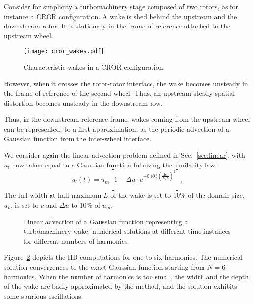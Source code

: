 
Consider for simplicity a turbomachinery stage composed of two rotors,
as for instance a CROR configuration.
A wake is shed behind
the upstream and the downstream rotor. 
It is stationary in the frame of reference attached to the upstream wheel.
\begin{figure}[htp]
    \centering\texttt{[image: cror\_wakes.pdf]}
  \caption{Characteristic wakes in a CROR configuration.}
  \label{fig:rotor-stator}
\end{figure}
However, when it crosses the rotor-rotor interface,
the wake becomes unsteady in the frame of reference of the second wheel. 
Thus, an upstream steady spatial distortion becomes unsteady in
the downstream row.

Thus, in the downstream reference frame, wakes coming 
from the upstream wheel can be represented, 
to a first approximation, as the periodic 
advection of a Gaussian function from the inter-wheel interface.

We consider again the linear advection problem defined in Sec.~\ref{sec:linear}, 
with $u_l$ now taken equal to a Gaussian function following the
\citet{Lakshminarayana1980} similarity law:
\begin{equation}
    u_l (t) = u_m \left[1 - 
        \Delta u \cdot e^{
          -0.693 \left(\frac{2 c t}{L_x L} \right) ^ 2}\right],
\end{equation}
The full width at half maximum $L$ of the wake is set to 10\% of the domain size, 
$u_m$ is set to $c$ and $\Delta u$ to 10\% of $u_m$.

\begin{figure}[htp]
  \centering
  \caption{Linear advection of a Gaussian function representing a turbomachinery wake: 
  numerical solutions at different time instances for different numbers of harmonics.}
  \label{fig:inj_wake_results}
\end{figure}
Figure~\ref{fig:inj_wake_results} depicts the HB
computations for one to six harmonics. The numerical solution convergences
to the exact Gaussian function starting from $N=6$ harmonics.
When the number of harmonics is
too small, the width and the depth of the wake are badly approximated
by the method, and the solution exhibits some spurious oscillations. 

